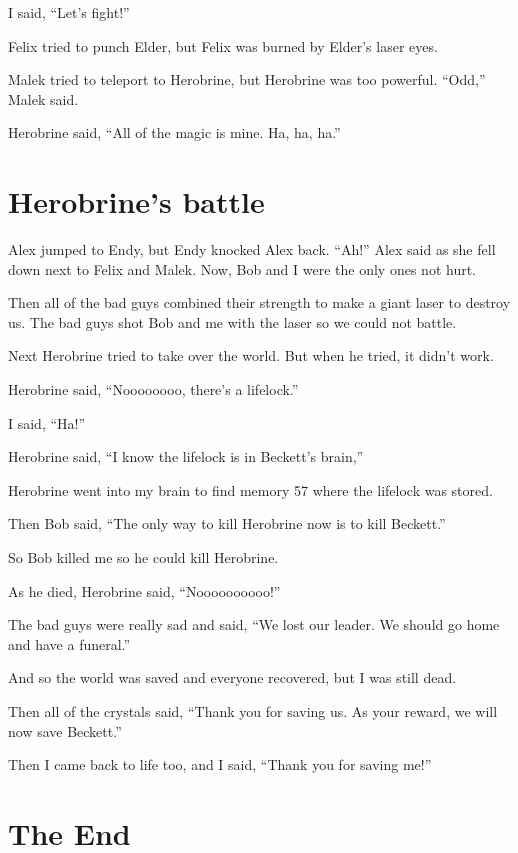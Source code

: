 \documentclass[12pt,oneside]{krantz}
\begin{document}
I said, ``Let's fight!''

Felix tried to punch Elder, but Felix was burned by Elder's laser eyes.

Malek tried to teleport to Herobrine, but Herobrine was too powerful.
``Odd,'' Malek said.

Herobrine said, ``All of the magic is mine. Ha, ha, ha.''

\hypertarget{herobrines-battle}{%
\chapter{Herobrine's battle}\label{herobrines-battle}}

Alex jumped to Endy, but Endy knocked Alex back. ``Ah!'' Alex said as
she fell down next to Felix and Malek. Now, Bob and I were the only ones
not hurt.

Then all of the bad guys combined their strength to make a giant laser
to destroy us. The bad guys shot Bob and me with the laser so we could
not battle.

Next Herobrine tried to take over the world. But when he tried, it
didn't work.

Herobrine said, ``Noooooooo, there's a lifelock.''

I said, ``Ha!''

Herobrine said, ``I know the lifelock is in Beckett's brain,''

Herobrine went into my brain to find memory 57 where the lifelock was
stored.

Then Bob said, ``The only way to kill Herobrine now is to kill
Beckett.''

So Bob killed me so he could kill Herobrine.

As he died, Herobrine said, ``Noooooooooo!''

The bad guys were really sad and said, ``We lost our leader. We should
go home and have a funeral.''

And so the world was saved and everyone recovered, but I was still dead.

Then all of the crystals said, ``Thank you for saving us. As your
reward, we will now save Beckett.''

Then I came back to life too, and I said, ``Thank you for saving me!''

\hypertarget{the-end}{%
\chapter*{The End}\label{the-end}}
\end{document}
